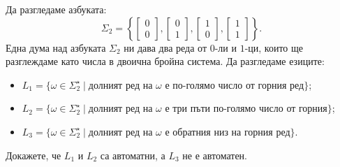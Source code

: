 \begin{problem}
  Да разгледаме азбуката:
  \[\Sigma_2 = \left\{\begin{bmatrix} 0\\0\end{bmatrix},\begin{bmatrix} 0\\1\end{bmatrix},\begin{bmatrix} 1\\0\end{bmatrix},\begin{bmatrix} 1\\1\end{bmatrix}\right\}.\]
  Една дума над азбуката $\Sigma_2$ ни дава два реда от $0$-ли и $1$-ци, които ще разглеждаме като числа в двоична бройна система.
  Да разгледаме езиците:
  \begin{itemize}
  \item 
    $L_1 = \{\omega \in \Sigma^\star_2 \mid \text{долният ред на }\omega\text{ е по-голямо число от горния ред}\}$;
  \item
    $L_2 = \{\omega \in \Sigma^\star_2 \mid \text{долният ред на }\omega\text{ е три пъти по-голямо число от горния}\}$;
  \item
    $L_3 = \{\omega \in \Sigma^\star_2 \mid \text{долният ред на }\omega\text{ е обратния низ на горния ред}\}$.
  \end{itemize}
  Докажете, че  $L_1$ и $L_2$ са автоматни, а $L_3$ не е автоматен.
\end{problem}
